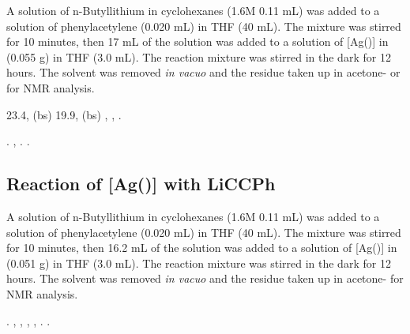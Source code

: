 A solution of n-Butyllithium in cyclohexanes (1.6M 0.11 mL) was added to a solution of phenylacetylene (0.020 mL) in THF (40 mL).  The mixture was stirred for 10 minutes, then 17 mL of the solution was added to a solution of [Ag(\tButhixantphos)] in (0.055 g) in THF (3.0 mL).  The reaction mixture was stirred in the dark for 12 hours.  The solvent was removed \emph{in vacuo} and the residue taken up in acetone- or  for NMR analysis.   

23.4, (bs)
19.9, (bs)
,
,
.

.
,
.
.

\subsection*{Reaction of \texorpdfstring{[Ag(\tBuxantphos)]} A with LiCCPh}

A solution of n-Butyllithium in cyclohexanes (1.6M 0.11 mL) was added to a solution of phenylacetylene (0.020 mL) in THF (40 mL).  The mixture was stirred for 10 minutes, then 16.2 mL of the solution was added to a solution of [Ag(\tBuxantphos)] in (0.051 g) in THF (3.0 mL).  The reaction mixture was stirred in the dark for 12 hours.  The solvent was removed \emph{in vacuo} and the residue taken up in acetone- for NMR analysis.   

.
,
,
,
,
.
.



